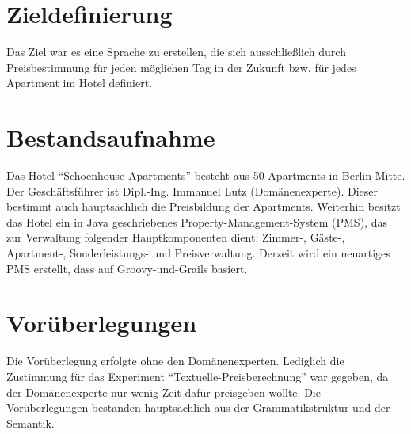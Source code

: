 \documentclass[11pt,english,ngerman, headsepline]{scrreprt}
\begin{document}
\section{Zieldefinierung}
Das Ziel war es eine Sprache zu erstellen, die sich ausschließlich durch
Preisbestimmung für jeden möglichen Tag in der Zukunft bzw. für jedes Apartment
im Hotel definiert.

\section{Bestandsaufnahme}
 Das Hotel
``Schoenhouse Apartments'' besteht aus 50 Apartments in Berlin Mitte. Der
Geschäftsführer ist Dipl.-Ing. Immanuel Lutz (Domänenexperte). Dieser bestimmt
auch hauptsächlich die Preisbildung der Apartments. Weiterhin besitzt das Hotel ein in Java
geschriebenes Property-Management-System (PMS), das zur Verwaltung folgender
Hauptkomponenten dient: Zimmer-, Gäste-, Apartment-, Sonderleistungs- und
Preisverwaltung.
Derzeit wird ein neuartiges PMS erstellt, dass auf Groovy-und-Grails basiert.
 
 \section{Vorüberlegungen}

Die Vorüberlegung erfolgte ohne den Domänenexperten. Lediglich die Zustimmung
für das Experiment ``Textuelle-Preisberechnung'' war gegeben, da der
Domänenexperte nur wenig Zeit dafür preisgeben wollte. Die Vorüberlegungen
bestanden hauptsächlich aus der Grammatikstruktur und der Semantik. 
\end{document}
